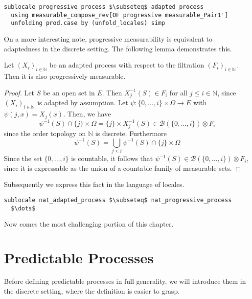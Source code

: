\begin{isalemma}
{\small
\begin{lstlisting}[style=isabelle]
sublocale progressive_process $\subseteq$ adapted_process 
  using measurable_compose_rev[OF progressive measurable_Pair1'] 
  unfolding prod.case by (unfold_locales) simp
\end{lstlisting}
}
\end{isalemma}

On a more interesting note, progressive measurability is equivalent to adaptedness in the discrete setting. The following lemma demonstrates this.

\begin{lemma}
	Let $(X_i)_{i \in \mathbb{N}}$ be an adapted process with respect to the filtration $(F_i)_{i \in \mathbb{N}}$. Then it is also progressively measurable.
\end{lemma}
\begin{proof}
	Let $S$ be an open set in $E$. Then $X_j^{-1}(S) \in F_i$ for all $j \le i \in \mathbb{N}$, since $(X_i)_{i \in \mathbb{N}}$ is adapted by assumption. Let $\psi : \{0,\dots,i\} \times \Omega \rightarrow E$ with $\psi(j,x) = X_j(x)$. Then, we have
	\[
		\psi^{-1}(S) \cap \{j\} \times \Omega = \{j\} \times X_j^{-1}(S) \in \mathcal{B}(\{0,\dots,i\}) \otimes F_i
	\]
	since the order topology on $\mathbb{N}$ is discrete. Furthermore
	\[
		\psi^{-1}(S) = \bigcup_{j \le i} \psi^{-1}(S) \cap \{j\} \times \Omega 
	\]
	Since the set $\{0,\dots,i\}$ is countable, it follows that $\psi^{-1}(S) \in \mathcal{B}(\{0,\dots,i\}) \otimes F_i$, since it is expressable as the union of a countable family of measurable sets.
\end{proof}

Subsequently we express this fact in the language of locales.

\begin{isalemma}
{\small
\begin{lstlisting}[style=isabelle]
sublocale nat_adapted_process $\subseteq$ nat_progressive_process
  $\dots$
\end{lstlisting}
}
\end{isalemma}

Now comes the most challenging portion of this chapter.

\section{Predictable Processes}

Before defining predictable processes in full generality, we will introduce them in the discrete setting, where the definition is easier to grasp.

